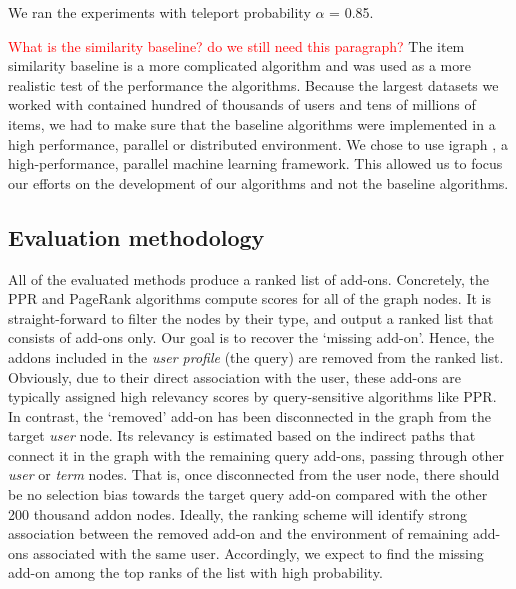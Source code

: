 \documentclass[11pt,oneside]{book}
\let\Oldsubsection\subsection
\renewcommand{\subsection}{\FloatBarrier\Oldsubsection}
\begin{document}
We ran the experiments with teleport probability $\alpha$ =
0.85.  

\textcolor{red}{What is the similarity baseline? do we still need this paragraph?} 
The item similarity baseline is a more complicated algorithm and was used as a
more realistic test of the performance the algorithms. Because the
largest datasets we worked with contained hundred of thousands of
users and tens of millions of items, we had to make sure that the
baseline algorithms were implemented in a high performance, parallel
or distributed environment. We chose to use igraph \citep{igraph}, a
high-performance, parallel machine learning framework. This allowed us
to focus our efforts on the development of our algorithms and not the
baseline algorithms.



\subsection{Evaluation methodology}

All of the evaluated methods produce a ranked list of add-ons. 
Concretely, the PPR and PageRank algorithms compute scores for all of the graph nodes.
It is straight-forward to filter the nodes by their type, and output a ranked list that consists of add-ons only.
Our goal is to recover the `missing add-on'. Hence, the addons included in the {\it user profile} (the query) are 
removed from the ranked list. Obviously, due to their direct association with the user, these add-ons are 
typically assigned high relevancy scores by query-sensitive algorithms like PPR. 
In contrast, the `removed' add-on has been disconnected in the graph from 
the target {\it user} node. Its relevancy is estimated based on the indirect paths that connect it in the graph with
the remaining query add-ons, passing through other {\it user} or {\it term} nodes. That is, once disconnected from the user node, there should be no selection bias towards the target query add-on compared with the other 200 thousand addon
nodes. Ideally, the ranking scheme will identify strong association between the removed add-on and the environment of remaining add-ons associated with the same user. Accordingly, we expect to find the missing add-on among the top ranks of the list with high probability.
\end{document}
